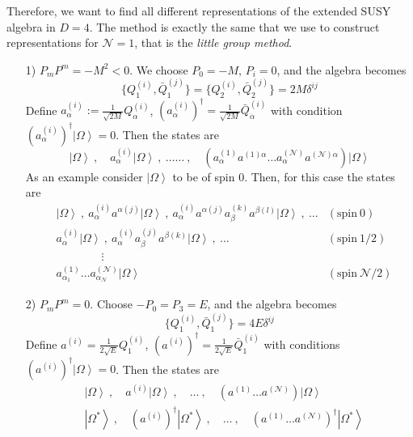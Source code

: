 \documentclass[a4paper,12pt]{article}
\numberwithin{equation}{section}
\numberwithin{exe}{section}
\newcommand{\Qb}{{\bar Q}}
\newcommand{\vac}{{\left|\Omega\right>}}
\renewcommand{\a}{{\alpha}}
\newcommand{\ad}{{\dot\alpha}}
\renewcommand{\b}{{\beta}}
\renewcommand{\d}{{\delta}}
\begin{document}
Therefore, we want to find all different representations of the extended SUSY algebra in $D=4$. The method is exactly the same that we use to construct representations for $\mathcal N=1$, that is the {\it little group method}.
	\begin{enumerate}
	\item[1)] $P_m P^m = -M^2 < 0$. We choose $P_0 = -M$, $P_i=0$, and the algebra becomes
		\begin{equation}
		\{Q^{(i)}_1, \Qb^{(j)}_1 \} = \{Q^{(i)}_2, \Qb^{(j)}_2\} = 2M \d^{ij}
		\end{equation}
	Define $a^{(i)}_\a := \frac{1}{\sqrt{2M}} Q^{(i)}_\a$, $(a^{(i)}_\a)^\dagger = \frac{1}{\sqrt{2M}} \Qb^{(i)}_\ad$ with condition $(a^{(i)}_\a)^\dagger\vac = 0$. Then the states are
		\begin{equation}
		\vac\ ,\quad a^{(i)}_\a\vac\ ,\ \ldots\ldots\ ,\quad (a^{(1)}_\a a^{(1)\a} \ldots a^{(\mathcal N)}_\a a^{(\mathcal N) \a})\vac
		\end{equation}
	As an example consider $\vac$ to be of spin $0$. Then, for this case the states are
		\begin{equation}
			\begin{aligned}
			& \vac\ ,\ a^{(i)}_\a a^{\a(j)}\vac\ ,\ a^{(i)}_\a a^{\a(j)}a^{(k)}_\b a^{\b(l)}\vac\ ,\ \ldots & (\text{spin}\ 0) \\
			& a^{(i)}_\a\vac\ ,\ a^{(i)}_\a a^{(j)}_\b a^{\b(k)}\vac\ ,\ \ldots & (\text{spin}\ 1/2) \\
			& \qquad\qquad \vdots & \\
			& a^{(1)}_{\a_1}\ldots a^{(\mathcal N)}_{\a_{\mathcal N}}\vac & (\text{spin}\ \mathcal N/2)
			\end{aligned}
		\end{equation}
	\item[2)] $P_m P^m = 0$. Choose $-P_0 = P_3 = E$, and the algebra becomes
		\begin{equation}
		\{Q^{(i)}_1, \Qb^{(j)}_1 \} = 4E \d^{ij}
		\end{equation}
	Define $a^{(i)} = \frac{1}{2\sqrt E} Q^{(i)}_1$, $(a^{(i)})^\dagger = \frac{1}{2\sqrt E}\Qb^{(i)}_1$ with conditions $(a^{(i)})^\dagger\vac = 0$. Then the states are
		\begin{equation}
			\begin{aligned}
			& \vac\ ,\quad a^{(i)}\vac\ ,\quad\ldots\ ,\quad (a^{(1)}\ldots a^{(\mathcal N)})\vac \\
			& \left|\Omega^*\right>\ ,\quad (a^{(i)})^\dagger\left|\Omega^*\right>\ ,\quad\ldots\ ,\quad (a^{(1)}\ldots a^{(\mathcal N)})^\dagger \left|\Omega^*\right>

\end{aligned}
\end{equation}
\end{enumerate}
\end{document}
